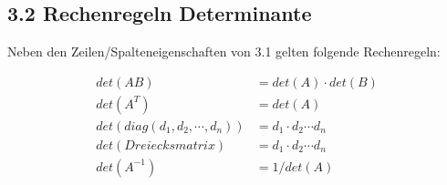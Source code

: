 \subsection{3.2 Rechenregeln Determinante}{
\vskip1pt
Neben den Zeilen/Spalteneigenschaften von 3.1 gelten folgende Rechenregeln: \par
\vspace{-3mm}

\hskip5pt
\begin{minipage}[t]{0.7 \columnwidth}
\begin{align}
det(A B) &= det(A) \cdot det(B)\nonumber \\
det(A^T) &= det(A) \nonumber \\
det(diag(d_{1}, d_{2}, \dotsm, d_n)) &= d_1 \cdot d_2 \dotsm d_n \nonumber \\
det(Dreiecksmatrix) &= d_1 \cdot d_2 \dotsm d_n \nonumber \\
det(A^{-1}) &= 1/det(A) \nonumber
\end{align}
\end{minipage}

}
\WhiteSpace